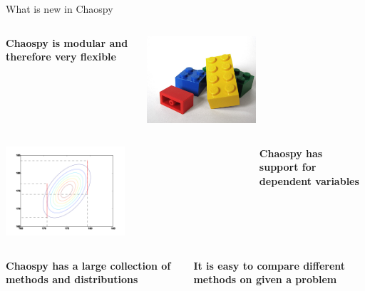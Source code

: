 \documentclass[handout]{beamer}
\begin{document}
\begin{frame}{What is new in Chaospy}

\vspace{-7mm}
\begin{columns}

     \begin{center}
      \textbf<1>{Chaospy is modular and therefore very flexible}
     \end{center}
     \begin{center}
            \includegraphics[width=0.5\textwidth]{lego.jpg}
     \end{center}

 \end{columns}

\pause
\vspace{7mm}
\begin{columns}
     \begin{center}
            \includegraphics[width=0.5\textwidth]{dependent.png}
     \end{center}
     \begin{center}
      \textbf<2>{Chaospy has support for dependent variables}
     \end{center}
 \end{columns}

\pause
\vspace{7mm}
 \begin{columns}
      \begin{center}
             \textbf<3>{Chaospy has a large collection of methods and distributions}
      \end{center}
      \begin{center}
      \pause \textbf<4>{It is easy to compare different methods on given a problem}
      \end{center}
  \end{columns}

\end{frame}
\end{document}
